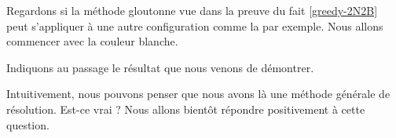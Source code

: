 Regardons si la méthode gloutonne vue dans la preuve du fait \ref{greedy-2N2B} peut s'appliquer à une autre configuration comme la  par exemple. Nous allons commencer avec la couleur blanche.

\begin{multicols}{2}
\begin{mvts}
	\medskip
	\item  {}

	\medskip
	\item  {}

	\medskip
	\item  {}

	\medskip
	\item  {}

	\medskip
	\item  {}

	\medskip
	\item  {}

	\medskip
	\item  {}

	\medskip
	\item  {}

	\medskip
	\item  {}

	\medskip
	\item  {}

	\medskip
	\item  {}

	\medskip
	\item  {}
\end{mvts}
\end{multicols}

Indiquons au passage le résultat que nous venons de démontrer.


 \label{greedy-3N2B}


\begin{remark}
	Intuitivement, nous pouvons penser que nous avons là une méthode générale de résolution.
	Est-ce vrai ? Nous allons bientôt répondre positivement à cette question.
\end{remark}

